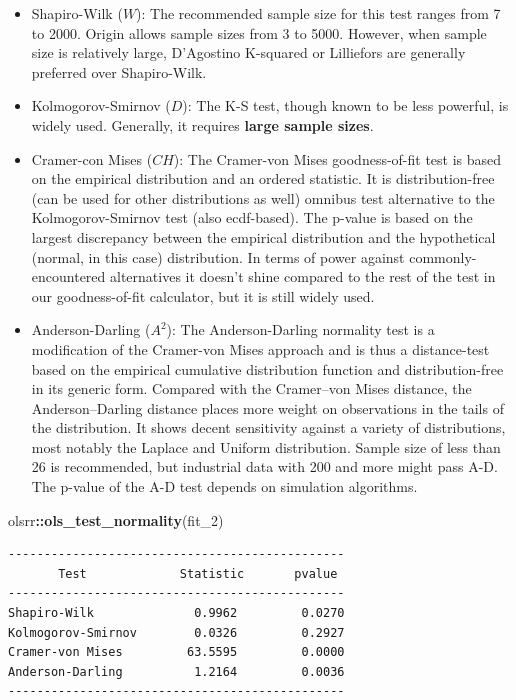 \documentclass[
]{article}
\newenvironment{Shaded}{\begin{snugshade}}{\end{snugshade}}
\newcommand{\FunctionTok}[1]{\textcolor[rgb]{0.13,0.29,0.53}{\textbf{#1}}}
\newcommand{\NormalTok}[1]{#1}
\newcommand{\SpecialCharTok}[1]{\textcolor[rgb]{0.81,0.36,0.00}{\textbf{#1}}}
\begin{document}
\begin{itemize}
\item
  Shapiro-Wilk (\(W\)): The recommended sample size for this test ranges
  from 7 to 2000. Origin allows sample sizes from 3 to 5000. However,
  when sample size is relatively large, D'Agostino K-squared or
  Lilliefors are generally preferred over Shapiro-Wilk.
\item
  Kolmogorov-Smirnov (\(D\)): The K-S test, though known to be less
  powerful, is widely used. Generally, it requires \textbf{large sample
  sizes}.
\item
  Cramer-con Mises (\(CH\)): The Cramer-von Mises goodness-of-fit test
  is based on the empirical distribution and an ordered statistic. It is
  distribution-free (can be used for other distributions as well)
  omnibus test alternative to the Kolmogorov-Smirnov test (also
  ecdf-based). The p-value is based on the largest discrepancy between
  the empirical distribution and the hypothetical (normal, in this case)
  distribution. In terms of power against commonly-encountered
  alternatives it doesn't shine compared to the rest of the test in our
  goodness-of-fit calculator, but it is still widely used.
\item
  Anderson-Darling (\(A^2\)): The Anderson-Darling normality test is a
  modification of the Cramer-von Mises approach and is thus a
  distance-test based on the empirical cumulative distribution function
  and distribution-free in its generic form. Compared with the
  Cramer--von Mises distance, the Anderson--Darling distance places more
  weight on observations in the tails of the distribution. It shows
  decent sensitivity against a variety of distributions, most notably
  the Laplace and Uniform distribution. Sample size of less than 26 is
  recommended, but industrial data with 200 and more might pass A-D. The
  p-value of the A-D test depends on simulation algorithms.
\end{itemize}

\begin{Shaded}
\begin{Highlighting}[]
\NormalTok{olsrr}\SpecialCharTok{::}\FunctionTok{ols\_test\_normality}\NormalTok{(fit\_2)}
\end{Highlighting}
\end{Shaded}

\begin{verbatim}
-----------------------------------------------
       Test             Statistic       pvalue  
-----------------------------------------------
Shapiro-Wilk              0.9962         0.0270 
Kolmogorov-Smirnov        0.0326         0.2927 
Cramer-von Mises         63.5595         0.0000 
Anderson-Darling          1.2164         0.0036 
-----------------------------------------------
\end{verbatim}
\end{document}
